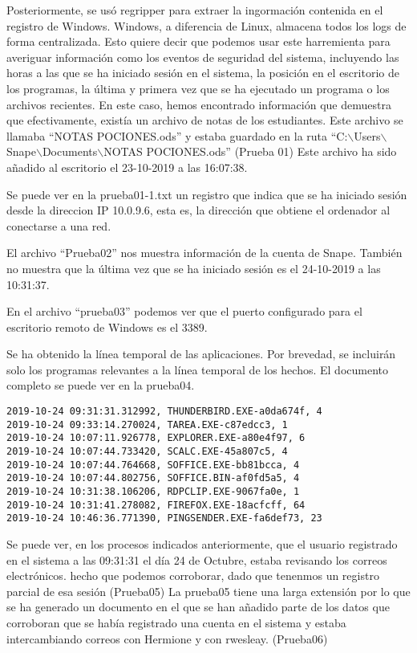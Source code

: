Posteriormente, se usó regripper \cite{regripper} para extraer la ingormación contenida en el registro de Windows. 
Windows, a diferencia de Linux, almacena todos los logs de forma centralizada.
Esto quiere decir que podemos usar este harremienta para averiguar información como los eventos de seguridad del sistema, incluyendo las horas a las que se ha iniciado sesión en el sistema, la posición en el escritorio de los programas, la última y primera vez que se ha ejecutado un programa o los archivos recientes.
En este caso, hemos encontrado información que demuestra que efectivamente, existía un archivo de notas de los estudiantes. Este archivo se llamaba ``NOTAS POCIONES.ods'' y estaba guardado en la ruta ``C:$\backslash$Users$\backslash$Snape$\backslash$Documents$\backslash$NOTAS POCIONES.ods'' (Prueba 01)
Este archivo ha sido añadido al escritorio el 23-10-2019 a las 16:07:38.

Se puede ver en la prueba01-1.txt un registro que indica que se ha iniciado sesión desde la direccion IP 10.0.9.6, esta es, la dirección que obtiene el ordenador al conectarse a una red.

El archivo ``Prueba02'' nos muestra información de la cuenta de Snape. También no muestra que la última vez que se ha iniciado sesión es el 24-10-2019 a las 10:31:37.

En el archivo ``prueba03'' podemos ver que el puerto configurado para el escritorio remoto de Windows es el 3389.

Se ha obtenido la línea temporal de las aplicaciones. Por brevedad, se incluirán solo los programas relevantes a la línea temporal de los hechos. El documento completo se puede ver en la prueba04.

\begin{lstlisting}
2019-10-24 09:31:31.312992, THUNDERBIRD.EXE-a0da674f, 4
2019-10-24 09:33:14.270024, TAREA.EXE-c87edcc3, 1
2019-10-24 10:07:11.926778, EXPLORER.EXE-a80e4f97, 6
2019-10-24 10:07:44.733420, SCALC.EXE-45a807c5, 4
2019-10-24 10:07:44.764668, SOFFICE.EXE-bb81bcca, 4
2019-10-24 10:07:44.802756, SOFFICE.BIN-af0fd5a5, 4
2019-10-24 10:31:38.106206, RDPCLIP.EXE-9067fa0e, 1
2019-10-24 10:31:41.278082, FIREFOX.EXE-18acfcff, 64
2019-10-24 10:46:36.771390, PINGSENDER.EXE-fa6def73, 23
\end{lstlisting}

Se puede ver, en los procesos indicados anteriormente, que el usuario registrado en el sistema a las 09:31:31 el día 24 de Octubre, estaba revisando los correos electrónicos.
hecho que podemos corroborar, dado que tenenmos un registro parcial de esa sesión (Prueba05)
La prueba05 tiene una larga extensión por lo que se ha generado un documento en el que se han añadido parte de los datos que corroboran que se había registrado una cuenta en el sistema y estaba intercambiando correos con Hermione y con rwesleay. (Prueba06)

